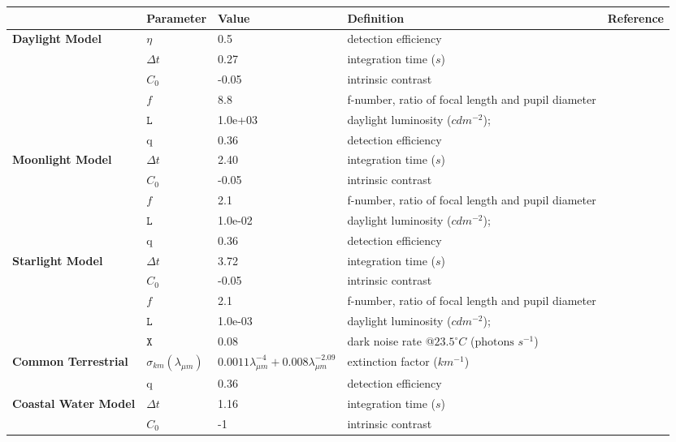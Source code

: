 \begin{tabular}{|L{3.5cm}|L{2.5cm}|L{2.5cm}|L{4.5cm}|L{4.5cm}|}
\hline
\textbf{ }&\textbf{Parameter}&\textbf{Value}&\textbf{Definition}&\textbf{Reference}\\\hline
\textbf{Daylight Model}&$\eta$&0.5&detection efficiency&\cite{Pirh07a}\\\hline
 &$\Delta t$&0.27&integration time ($s$)&\cite{Donn95a}\\\hline
 &$C_{0}$&-0.05&intrinsic contrast&\cite{Blac46a}\\\hline
 &$f$&8.8&f-number, ratio of focal length and pupil diameter&\cite{Mill79a}\\\hline
 &$\mathtt{L}$&1.0e+03&daylight luminosity ($cd m^{-2}$);&\cite{Midd52a}\\\hline
 &q&0.36&detection efficiency&\cite{Nils14a}\\\hline
\textbf{Moonlight Model}&$\Delta t$&2.40&integration time ($s$)&\cite{Donn95a}\\\hline
 &$C_{0}$&-0.05&intrinsic contrast&\cite{Blac46a}\\\hline
 &$f$&2.1&f-number, ratio of focal length and pupil diameter&\cite{Mill79a}\\\hline
 &$\mathtt{L}$&1.0e-02&daylight luminosity ($cd m^{-2}$);&\cite{Midd52a}\\\hline
 &q&0.36&detection efficiency&\cite{Nils14a}\\\hline
\textbf{Starlight Model}&$\Delta t$&3.72&integration time ($s$)&\cite{Donn95a}\\\hline
 &$C_{0}$&-0.05&intrinsic contrast&\cite{Blac46a}\\\hline
 &$f$&2.1&f-number, ratio of focal length and pupil diameter&\cite{Mill79a}\\\hline
 &$\mathtt{L}$&1.0e-03&daylight luminosity ($cd m^{-2}$);&\cite{Midd52a}\\\hline
 &$\mathtt{X}$&0.08&dark noise rate @$23.5^{\circ} C$ ($\text{photons } s^{-1}$)&\cite{Aho93a}\\\hline
\textbf{Common Terrestrial}&$\sigma_{km} (\lambda_{\mu m})$&$0.0011 \lambda_{\mu m}^{-4} + 0.008 \lambda_{\mu m}^{-2.09}$&extinction factor ($km^{-1}$)&\cite{Midd52a}\\\hline
 &q&0.36&detection efficiency&\cite{Nils14a}\\\hline
\textbf{Coastal Water Model}&$\Delta t$&1.16&integration time ($s$)&\cite{Donn95a}\\\hline
 &$C_{0}$&-1&intrinsic contrast&\cite{Nils14a}\\\hline

\end{tabular}
